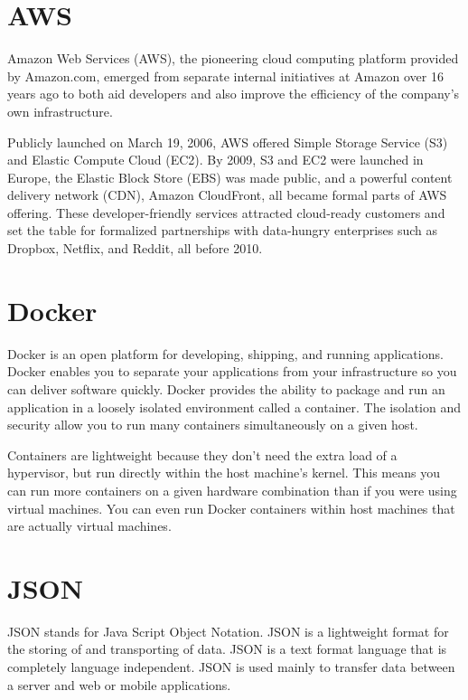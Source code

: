 \section {AWS}
Amazon Web Services (AWS), the pioneering cloud computing platform provided by Amazon.com, emerged from separate internal initiatives at Amazon over 16 years ago to both aid developers and also improve the efficiency of the company’s own infrastructure.\newline

Publicly launched on March 19, 2006, AWS offered Simple Storage Service (S3) and Elastic Compute Cloud (EC2). By 2009, S3 and EC2 were launched in Europe, the Elastic Block Store (EBS) was made public, and a powerful content delivery network (CDN), Amazon CloudFront, all became formal parts of AWS offering. These developer-friendly services attracted cloud-ready customers and set the table for formalized partnerships with data-hungry enterprises such as Dropbox, Netflix, and Reddit, all before 2010.\newline

\section {Docker}
Docker is an open platform for developing, shipping, and running applications. Docker enables you to separate your applications from your infrastructure so you can deliver software quickly. Docker provides the ability to package and run an application in a loosely isolated environment called a container. The isolation and security allow you to run many containers simultaneously on a given host.
\newline

Containers are lightweight because they don’t need the extra load of a hypervisor, but run directly within the host machine’s kernel. This means you can run more containers on a given hardware combination than if you were using virtual machines. You can even run Docker containers within host machines that are actually virtual machines.

\section {JSON}
JSON stands for Java Script Object Notation. JSON is a lightweight format for the storing of and transporting of data. JSON is a text format language that is completely language independent. JSON is used mainly to transfer data between a server and web or mobile applications. 
\cite{S235271101830050520190101}

\newline



